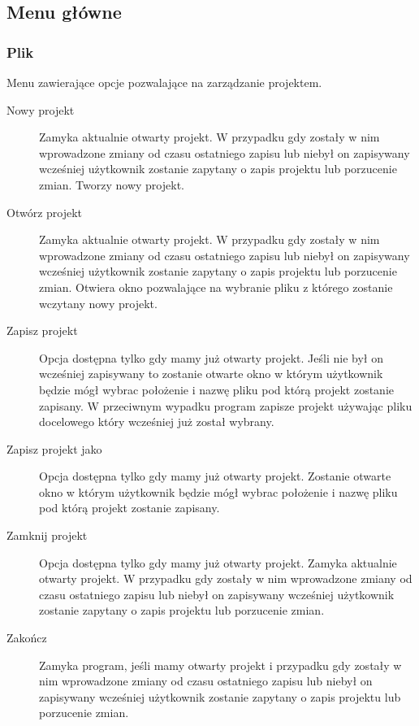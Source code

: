 \documentclass[a4paper,10pt]{article}
\begin{document}
\subsection{Menu główne}
\subsubsection{Plik}
Menu zawierające opcje pozwalające na zarządzanie projektem.
\begin{description}
\item[Nowy projekt] Zamyka aktualnie otwarty projekt. W przypadku gdy zostały w nim wprowadzone zmiany od czasu ostatniego zapisu lub niebył on zapisywany wcześniej użytkownik zostanie zapytany o zapis projektu lub porzucenie zmian. Tworzy nowy projekt.
\item[Otwórz projekt] Zamyka aktualnie otwarty projekt. W przypadku gdy zostały w nim wprowadzone zmiany od czasu ostatniego zapisu lub niebył on zapisywany wcześniej użytkownik zostanie zapytany o zapis projektu lub porzucenie zmian. Otwiera okno pozwalające na wybranie pliku z którego zostanie wczytany nowy projekt.
\item[Zapisz projekt] Opcja dostępna tylko gdy mamy już otwarty projekt. Jeśli nie był on wcześniej zapisywany to zostanie otwarte okno w którym użytkownik będzie mógł wybrac położenie i nazwę pliku pod którą projekt zostanie zapisany. W przeciwnym wypadku program zapisze projekt używając pliku docelowego który wcześniej już został wybrany.
\item[Zapisz projekt jako] Opcja dostępna tylko gdy mamy już otwarty projekt. Zostanie otwarte okno w którym użytkownik będzie mógł wybrac położenie i nazwę pliku pod którą projekt zostanie zapisany.
\item[Zamknij projekt] Opcja dostępna tylko gdy mamy już otwarty projekt. Zamyka aktualnie otwarty projekt. W przypadku gdy zostały w nim wprowadzone zmiany od czasu ostatniego zapisu lub niebył on zapisywany wcześniej użytkownik zostanie zapytany o zapis projektu lub porzucenie zmian.
\item[Zakończ] Zamyka program, jeśli mamy otwarty projekt i przypadku gdy zostały w nim wprowadzone zmiany od czasu ostatniego zapisu lub niebył on zapisywany wcześniej użytkownik zostanie zapytany o zapis projektu lub porzucenie zmian. 
\end{description}
\end{document}
